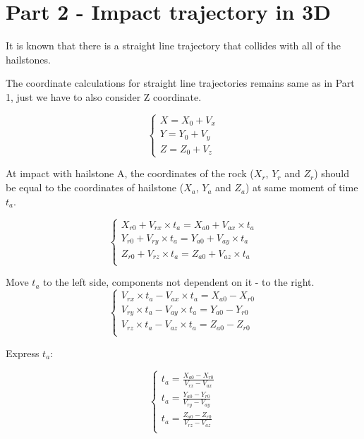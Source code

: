 \documentclass{article}
\begin{document}
\section{Part 2 - Impact trajectory in 3D} \label{part-2}

It is known that there is a straight line trajectory that collides with all of the hailstones.

The coordinate calculations for straight line trajectories remains same as in Part 1, just we have to also consider Z coordinate.

\begin{displaymath}
    \begin{cases}
        X = X_{0} + V_{x} \\
        Y = Y_{0} + V_{y} \\
        Z = Z_{0} + V_{z}
    \end{cases}
\end{displaymath}

At impact with hailstone A, the coordinates of the rock ($X_r$, $Y_r$ and $Z_r$) should be equal to the coordinates of hailstone ($X_a$, $Y_a$ and $Z_a$)
at same moment of time $t_a$.

\begin{equation}
    \begin{cases}
        X_{r0} + V_{rx} \times t_a = X_{a0} + V_{ax} \times t_a \\
        Y_{r0} + V_{ry} \times t_a = Y_{a0} + V_{ay} \times t_a \\
        Z_{r0} + V_{rz} \times t_a = Z_{a0} + V_{az} \times t_a \\
    \end{cases}
\end{equation}

Move $t_a$ to the left side, components not dependent on it - to the right.
\begin{displaymath}
    \begin{cases}
        V_{rx} \times t_a - V_{ax} \times t_a = X_{a0} - X_{r0} \\
        V_{ry} \times t_a - V_{ay} \times t_a = Y_{a0} - Y_{r0} \\
        V_{rz} \times t_a - V_{az} \times t_a = Z_{a0} - Z_{r0} \\
    \end{cases}
\end{displaymath}

Express $t_a$:

\begin{displaymath}
    \begin{cases}
        t_a = \frac{X_{a0} - X_{r0}}{V_{rx} - V_{ax}} \\
        t_a = \frac{Y_{a0} - Y_{r0}}{V_{ry} - V_{ay}} \\
        t_a = \frac{Z_{a0} - Z_{r0}}{V_{rz} - V_{az}} \\
    \end{cases}
\end{displaymath}
\end{document}
